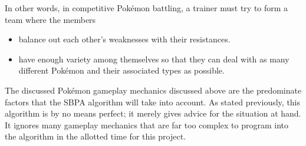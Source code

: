 \documentclass{article}
\begin{document}
In other words, in competitive Pok\'emon battling, a trainer must try to form a team where the members
\begin{itemize}
	\item balance out each other's weaknesses with their resistances.
	\item have enough variety among themselves so that they can deal with as many different Pok\'emon and their associated types as possible.
\end{itemize}
The discussed Pok\'emon gameplay mechanics discussed above are the predominate factors that the SBPA algorithm will take into account. As stated previously, this algorithm is by no means perfect; it merely gives advice for the situation at hand. It ignores many gameplay mechanics that are far too complex to program into the algorithm in the allotted time for this project.
\end{document}
